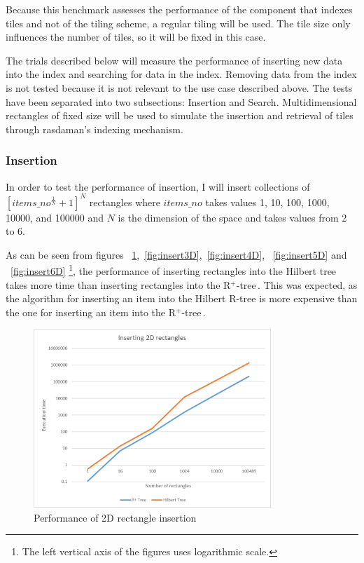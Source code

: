 \documentclass[11pt, a4paper, oneside]{article}
\newcommand{\rtree}{R$^+$-tree$\,$}
\begin{document}
Because this benchmark assesses the performance of the component that indexes tiles and not of the tiling scheme, a regular tiling will be used. The tile size only influences the number of tiles, so it will be fixed in this case.


 The trials described below will measure the performance of inserting new data into the index and searching for data in the index. Removing data from the index is not tested because it is not relevant to the use case described above. The tests have been separated into two subsections: Insertion and Search. Multidimensional rectangles of fixed size will be used to simulate the insertion and retrieval of tiles through rasdaman's indexing mechanism.
 
\subsubsection*{Insertion}
In order to test the performance of insertion, I will insert collections of $[items\_no ^ {\frac{1}{N}} + 1 ]^N $ rectangles where $items\_no$ takes values 1, 10, 100, 1000, 10000, and 100000  and $N$ is the dimension of the space and takes values from 2 to 6.

As can be seen from figures ~\ref{fig:insert2D},~\ref{fig:insert3D},~\ref{fig:insert4D}, ~\ref{fig:insert5D} and ~\ref{fig:insert6D} \footnote{The left vertical axis of the figures uses logarithmic scale.}, the performance of inserting rectangles into the Hilbert tree takes more time than inserting rectangles into the \rtree . This was expected, as the algorithm for inserting an item into the Hilbert R-tree is more expensive than the one for inserting an item into the \rtree.

\begin{figure}[H]
  \centering
    \includegraphics[width=0.8\textwidth]{img/insert2D}
      \caption{Performance of 2D rectangle insertion}
  \label{fig:insert2D}
\end{figure}
\end{document}
